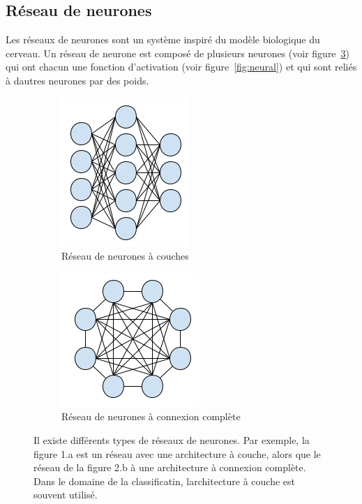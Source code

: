 \documentclass[11pt]{sdm}
\begin{document}
	\subsection{R\'eseau de neurones}
		Les r\'eseaux de neurones sont un syst\`eme inspir\'e du mod\`ele biologique du cerveau. Un r\'eseau de neurone est compos\'e de plusieurs neurones (voir figure~\ref{fig:neuralNetwork}) qui ont chacun une fonction d’activation (voir figure~\ref{fig:neural}) et qui sont reli\'es \`a d\textquotesingle autres neurones par des poids.

		\bigbreak

		\begin{figure}[!ht]
			\centering
			\begin{subfigure}{0.45\textwidth}
				\centering	
				\includegraphics[scale=0.7,natwidth=183,natheight=213]{figures/neuralNetworkLayers.png}
				\caption{R\'eseau de neurones \`a couches}
				\label{fig:nnl}
			\end{subfigure}
			\hspace*{\fill}
			\begin{subfigure}{0.45\textwidth}	
				\centering
				\includegraphics[scale=0.7,natwidth=198,natheight=192]{figures/neuralNetworkCompleteConnexion.png}
				\caption{R\'eseau de neurones \`a connexion compl\`ete}
				\label{fig:nnc}
			\end{subfigure}
			\caption{Il existe diff\'erents types de r\'eseaux de neurones. Par exemple, la figure 1.a est un r\'eseau avec une architecture \`a couche, alors que le r\'eseau de la figure 2.b \`a une architecture \`a connexion compl\`ete. Dans le domaine de la classificatin, l\textquotesingle architecture \`a couche est souvent utilis\'e.}
			\label{fig:neuralNetwork}
		\end{figure}
\end{document}
